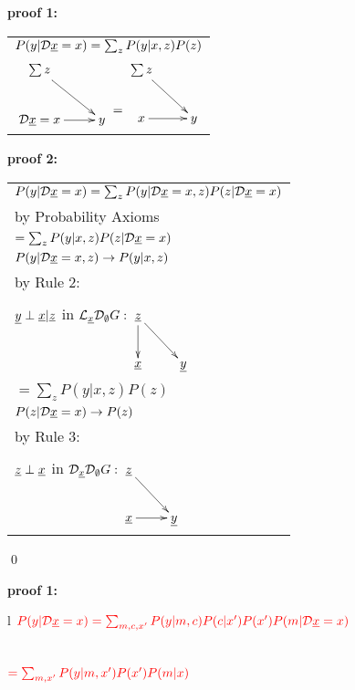 \proof

{\bf * proof 1:}
\begin{longtable}{l}
\color{red}
$P(y|{\cal D}{\underline{x}}=x)=\sum_z
 P(y|x, z)P(z)$
\\
$\xymatrix{
\sum z\ar[dr]
\\
\cald \rvx=x\ar[r]
&y
}
\xymatrix{\\=}
\xymatrix{
\sum z\ar[dr]
\\
x\ar[r]
&y
}
$
\end{longtable}


{\bf * proof 2:}
\begin{longtable}{l}
\color{red}
$P(y|{\cal D}{\underline{x}}=x)
=
\sum_z
P(y|{\cal D}{\underline{x}}=x, z)
P(z|{\cal D}{\underline{x}}=x)$
\\
\quad by Probability Axioms
\\
\color{red}
$=\sum_z
P(y|x, z)
P(z|{\cal D}{\underline{x}}=x)$
\\
\quad $P(y|{\cal D} {\underline{x}}=x, z)\rightarrow
P(y|x, z)$
\\
\quad  by Rule 2:
\begin{tabular}{l}
\\
\end{tabular}
\\
\quad
${\underline{y}}\perp{\underline{x}}|{\underline{z}}$ in
$\call_\rvx\cald_\emptyset G:
\xymatrix{
\rvz\ar[d]\ar[rd]
\\
\rvx
&\rvy
}$
\\
\color{red}
$=\sum_z
P(y|x, z)
P(z)$
\\
\quad $P(z|{\cal D} {\underline{x}}=x)\rightarrow
P(z)$
\\
\quad  by Rule 3:
\begin{tabular}{l}
\\
\end{tabular}
\\
\quad
${\underline{z}}\perp {\underline{x}}$ in
$\cald_\rvx \cald_\emptyset G:
\xymatrix{
\rvz\ar[rd]
\\
\rvx\ar[r]
&\rvy
}
$
\end{longtable}
\qed


\begin{claim}
\label{cl-decFrontDoor}
\decFrontDoor
\end{claim}

\proof


{\bf * proof 1:}
\\
\begin{longtable}{l}
$\color{red}
P(y|{\cal D}{\underline{x}}=x)=
\sum_{m, c, x'}
P(y|m, c)P(c|x')P(x')
P(m|{\cal D}{\underline{x}}=x)$
\\
\\
\xymatrix{\\=}
\\
$\color{red}=
\sum_{m,x'}
P(y|m, x')
P(x')
P(m|x)$
\\
\xymatrix{\\=}
\end{longtable}



